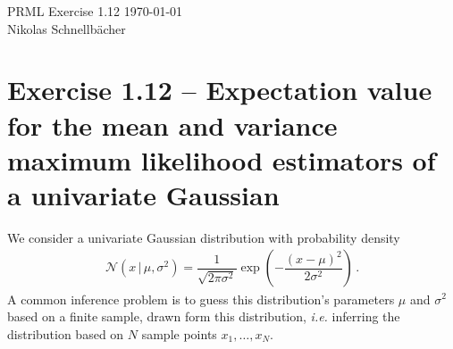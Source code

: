 \documentclass[11pt, DINA4, fleqn]{amsart}
\begin{document}

\tikzset{node distance = 2cm, auto}



\begin{flushleft}
{\sc \Large PRML Exercise 1.12} \hfill \today \\
\medskip
Nikolas Schnellbächer \underline{\hspace{6.53in}} \\
\end{flushleft}

\section*{Exercise 1.12 -- Expectation value for the mean and variance maximum likelihood estimators of a univariate Gaussian}
We consider a univariate Gaussian distribution with probability density
\begin{align}
\mathcal{N}\left(x \,\bigl| \, \mu, \sigma^2\right) = \dfrac{1}{\sqrt{2\pi \sigma^2}}\exp\left(-\dfrac{(x-\mu)^2}{2\sigma^2}\right) \, .
\end{align}
A common inference problem is to guess this distribution's parameters $\mu$ and $\sigma^2$ based on a finite sample, drawn form this distribution, \textit{i.e.}
inferring the distribution based on $N$ sample points $x_1, \dots, x_N$.
\end{document}

